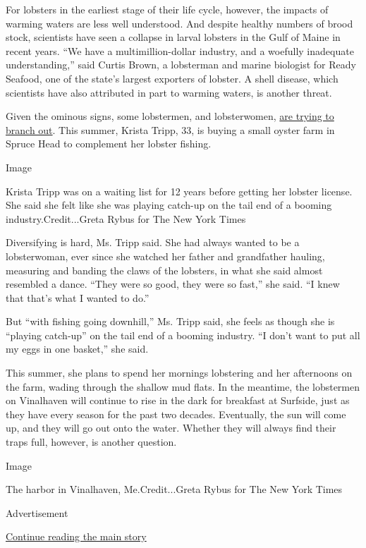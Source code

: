 For lobsters in the earliest stage of their life cycle, however, the
impacts of warming waters are less well understood. And despite healthy
numbers of brood stock, scientists have seen a collapse in larval
lobsters in the Gulf of Maine in recent years. ``We have a
multimillion-dollar industry, and a woefully inadequate understanding,''
said Curtis Brown, a lobsterman and marine biologist for Ready Seafood,
one of the state's largest exporters of lobster. A shell disease, which
scientists have also attributed in part to warming waters, is another
threat.

Given the ominous signs, some lobstermen, and lobsterwomen,
\href{https://www.nytimes.com/interactive/2017/10/10/us/aquaculture.html}{are
trying to branch out}. This summer, Krista Tripp, 33, is buying a small
oyster farm in Spruce Head to complement her lobster fishing.

Image

Krista Tripp was on a waiting list for 12 years before getting her
lobster license. She said she felt like she was playing catch-up on the
tail end of a booming industry.Credit...Greta Rybus for The New York
Times

Diversifying is hard, Ms. Tripp said. She had always wanted to be a
lobsterwoman, ever since she watched her father and grandfather hauling,
measuring and banding the claws of the lobsters, in what she said almost
resembled a dance. ``They were so good, they were so fast,'' she said.
``I knew that that's what I wanted to do.''

But ``with fishing going downhill,'' Ms. Tripp said, she feels as though
she is ``playing catch-up'' on the tail end of a booming industry. ``I
don't want to put all my eggs in one basket,'' she said.

This summer, she plans to spend her mornings lobstering and her
afternoons on the farm, wading through the shallow mud flats. In the
meantime, the lobstermen on Vinalhaven will continue to rise in the dark
for breakfast at Surfside, just as they have every season for the past
two decades. Eventually, the sun will come up, and they will go out onto
the water. Whether they will always find their traps full, however, is
another question.

Image

The harbor in Vinalhaven, Me.Credit...Greta Rybus for The New York Times

Advertisement

\protect\hyperlink{after-bottom}{Continue reading the main story}

